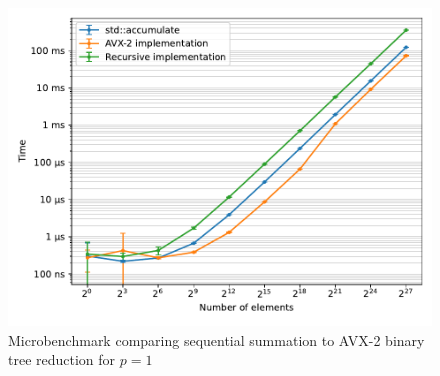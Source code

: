 \begin{figure}
\centering
\includegraphics[scale=0.72]{figures/benchmarkVectorization}
\caption{Microbenchmark comparing sequential summation to AVX-2 binary tree reduction for $p=1$}
\label{fig:benchmarkVectorization}
\end{figure}
